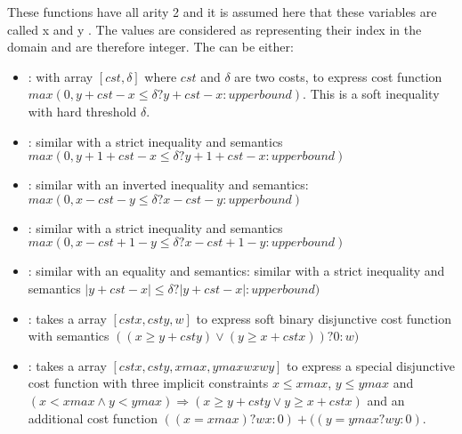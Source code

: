 \documentclass[letterpaper,10pt,openany,oneside,english]{sphinxmanual}
\begin{document}
\sphinxAtStartPar
These functions have all arity 2 and it is assumed here that these variables are called x and y . The values are considered as representing their index in the domain and are therefore integer. The  can be either:
\begin{itemize}
\item {} 
\sphinxAtStartPar
{} : with  array \([ cst , \delta ]\)
where \(cst\) and \(\delta\) are two costs, to express cost
function \(max(0, y + cst - x \leq \delta ? y + cst - x : upperbound)\). This is a soft inequality with hard threshold \(\delta\).

\item {} 
\sphinxAtStartPar
{}: similar with a strict inequality and semantics
\(max(0, y + 1 + cst - x \leq \delta ? y + 1 + cst - x : upperbound)\)

\item {} 
\sphinxAtStartPar
{}: similar with an inverted inequality and semantics:
\(max(0, x - cst - y \leq \delta ? x - cst - y : upperbound)\)

\item {} 
\sphinxAtStartPar
{}: similar with a strict inequality and semantics
\(max(0, x - cst + 1 - y \leq \delta ? x - cst + 1 - y : upperbound)\)

\item {} 
\sphinxAtStartPar
{}: similar with an equality and semantics: similar with a strict
inequality and semantics
\(\left| y + cst - x \right| \leq \delta ? \left|y + cst - x \right| : upperbound)\)

\item {} 
\sphinxAtStartPar
{}: takes a  array \([ cstx, csty, w]\)
to express soft binary disjunctive cost function with semantics \(( (x \geq y + csty) \lor ( y \geq x + cstx)) ? 0 : w)\)

\item {} 
\sphinxAtStartPar
{}: takes a  array \([ cstx, csty, xmax, ymax wx wy]\) to express a special disjunctive cost function with three implicit constraints \(x \leq xmax\), \(y \leq ymax\) and \(( x < xmax \land y < ymax) \Rightarrow ( x \geq y + csty \lor  y \geq x + cstx)\) and an additional cost function \(( (x = xmax) ? wx : 0) + ( (y = y max? wy : 0)\).

\end{itemize}
\end{document}
